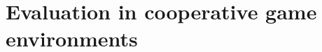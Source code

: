 \documentclass[runningheads]{llncs}
\begin{document}



\section{Evaluation in cooperative game environments}



\end{document}
